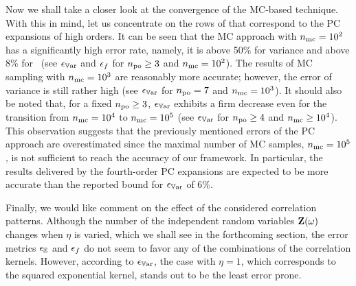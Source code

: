 
Now we shall take a closer look at the convergence of the MC-based technique. With this in mind, let us concentrate on the rows of  that correspond to the PC expansions of high orders.
It can be seen that the MC approach with ${n_\text{mc}} = 10^2$ has a significantly high error rate, namely, it is above 50\% for variance and above 8\% for \pdfs\ (see $\epsilon_{\mathbb{V}\text{ar}}$ and $\epsilon_f$ for ${n_\text{po}} \geq 3$ and ${n_\text{mc}} = 10^2$).
The results of MC sampling with ${n_\text{mc}} = 10^3$ are reasonably more accurate; however, the error of variance is still rather high (see $\epsilon_{\mathbb{V}\text{ar}}$ for ${n_\text{po}} = 7$ and ${n_\text{mc}} = 10^3$).
It should also be noted that, for a fixed ${n_\text{po}} \geq 3$, $\epsilon_{\mathbb{V}\text{ar}}$ exhibits a firm decrease even for the transition from ${n_\text{mc}} = 10^4$ to ${n_\text{mc}} = 10^5$ (see $\epsilon_{\mathbb{V}\text{ar}}$ for ${n_\text{po}} \geq 4$ and ${n_\text{mc}} \geq 10^4$).
This observation suggests that the previously mentioned errors of the PC approach are overestimated since the maximal number of MC samples, ${n_\text{mc}} = 10^5$, is not sufficient to reach the accuracy of our framework.
In particular, the results delivered by the fourth-order PC expansions are expected to be more accurate than the reported bound for $\epsilon_{\mathbb{V}\text{ar}}$ of 6\%.

Finally, we would like comment on the effect of the considered correlation patterns.
Although the number of the independent random variables $\mathbf{Z}(\omega)$ changes when $\eta$ is varied, which we shall see in the forthcoming section, the error metrics $\epsilon_\mathbb{E}$ and $\epsilon_f$ do not seem to favor any of the combinations of the correlation kernels.
However, according to $\epsilon_{\mathbb{V}\text{ar}}$, the case with $\eta = 1$, which corresponds to the squared exponential kernel, stands out to be the least error prone.
